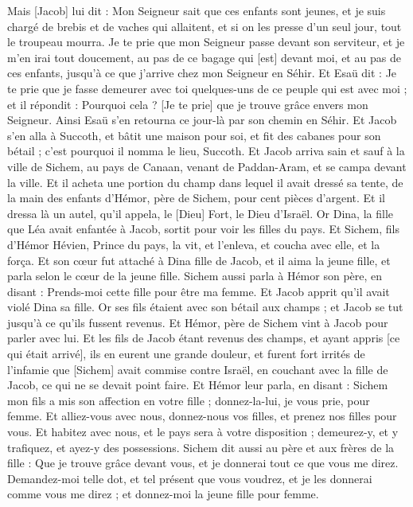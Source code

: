 \begin{multicols}{2}
Mais [Jacob] lui dit : Mon Seigneur sait que ces enfants sont jeunes, et je suis chargé de brebis et de vaches qui allaitent, et si on les presse d'un seul jour, tout le troupeau mourra.
Je te prie que mon Seigneur passe devant son serviteur, et je m'en irai tout doucement, au pas de ce bagage qui [est] devant moi, et au pas de ces enfants, jusqu'à ce que j'arrive chez mon Seigneur en Séhir.
Et Esaü dit : Je te prie que je fasse demeurer avec toi quelques-uns de ce peuple qui est avec moi ; et il répondit : Pourquoi cela ? [Je te prie] que je trouve grâce envers mon Seigneur.
Ainsi Esaü s'en retourna ce jour-là par son chemin en Séhir.
Et Jacob s'en alla à Succoth, et bâtit une maison pour soi, et fit des cabanes pour son bétail ; c'est pourquoi il nomma le lieu, Succoth.
Et Jacob arriva sain et sauf à la ville de Sichem, au pays de Canaan, venant de Paddan-Aram, et se campa devant la ville.
Et il acheta une portion du champ dans lequel il avait dressé sa tente, de la main des enfants d'Hémor, père de Sichem, pour cent pièces d'argent.
Et il dressa là un autel, qu'il appela, le [Dieu] Fort, le Dieu d'Israël.
\VerseOne{}Or Dina, la fille que Léa avait enfantée à Jacob, sortit pour voir les filles du pays.
Et Sichem, fils d'Hémor Hévien, Prince du pays, la vit, et l'enleva, et coucha avec elle, et la força.
Et son cœur fut attaché à Dina fille de Jacob, et il aima la jeune fille, et parla selon le cœur de la jeune fille.
Sichem aussi parla à Hémor son père, en disant : Prends-moi cette fille pour être ma femme.
Et Jacob apprit qu'il avait violé Dina sa fille. Or ses fils étaient avec son bétail aux champs ; et Jacob se tut jusqu'à ce qu'ils fussent revenus.
Et Hémor, père de Sichem vint à Jacob pour parler avec lui.
Et les fils de Jacob étant revenus des champs, et ayant appris [ce qui était arrivé], ils en eurent une grande douleur, et furent fort irrités de l'infamie que [Sichem] avait commise contre Israël, en couchant avec la fille de Jacob, ce qui ne se devait point faire.
Et Hémor leur parla, en disant : Sichem mon fils a mis son affection en votre fille ; donnez-la-lui, je vous prie, pour femme.
Et alliez-vous avec nous, donnez-nous vos filles, et prenez nos filles pour vous.
Et habitez avec nous, et le pays sera à votre disposition ; demeurez-y, et y trafiquez, et ayez-y des possessions.
Sichem dit aussi au père et aux frères de la fille : Que je trouve grâce devant vous, et je donnerai tout ce que vous me direz.
Demandez-moi telle dot, et tel présent que vous voudrez, et je les donnerai comme vous me direz ; et donnez-moi la jeune fille pour femme.

\end{multicols}
